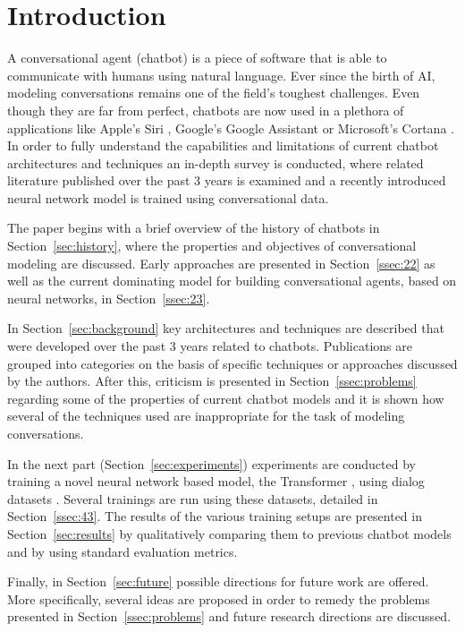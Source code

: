 \documentclass[12pt]{article}
\begin{document}
\newpage\tableofcontents
\newpage\section{Introduction} \label{sec:intro}

A conversational agent (chatbot) is a piece of software that is able to communicate with humans using natural language. Ever since the birth of AI, modeling conversations remains one of the field's toughest challenges. Even though they are far from perfect, chatbots are now used in a plethora of applications like Apple's Siri \cite{Siri:2017}, Google's Google Assistant \cite{Google:2017} or Microsoft's Cortana \cite{Cortana:2017}. In order to fully understand the capabilities and limitations of current chatbot architectures and techniques an in-depth survey is conducted, where related literature published over the past 3 years is examined and a recently introduced neural network model is trained using conversational data. 

The paper begins with a brief overview of the history of chatbots in Section~\ref{sec:history}, where the properties and objectives of conversational modeling are discussed. Early approaches are presented in Section~\ref{ssec:22} as well as the current dominating model for building conversational agents, based on neural networks, in Section~\ref{ssec:23}.

In Section~\ref{sec:background} key architectures and techniques are described that were developed over the past 3 years related to chatbots. Publications are grouped into categories on the basis of specific techniques or approaches discussed by the authors. After this, criticism is presented in Section~\ref{ssec:problems} regarding some of the properties of current chatbot models and it is shown how several of the techniques used are inappropriate for the task of modeling conversations.

In the next part (Section~\ref{sec:experiments}) experiments are conducted by training a novel neural network based model, the Transformer \cite{Vaswani:2017}, using dialog datasets \cite{Danescu:2011,Tiedemann:2009,OpenSubtitles:2016}. Several trainings are run using these datasets, detailed in Section~\ref{ssec:43}. The results of the various training setups are presented in Section~\ref{sec:results} by qualitatively comparing them to previous chatbot models and by using standard evaluation metrics.

Finally, in Section~\ref{sec:future} possible directions for future work are offered. More specifically, several ideas are proposed in order to remedy the problems presented in Section~\ref{ssec:problems} and future research directions are discussed.
\end{document}
